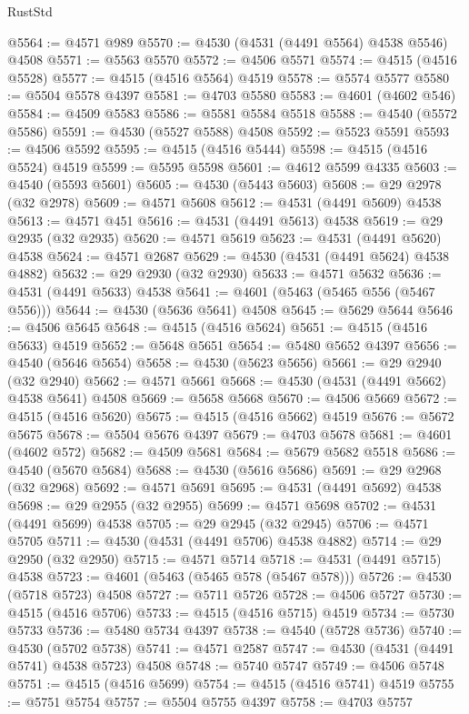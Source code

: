 \begin{lexlean}{RustStd}
\begin{coremodule}
@5564 := @4571 @989
@5570 := @4530 (@4531 (@4491 @5564) @4538 @5546) @4508
@5571 := @5563 @5570
@5572 := @4506 @5571
@5574 := @4515 (@4516 @5528)
@5577 := @4515 (@4516 @5564) @4519
@5578 := @5574 @5577
@5580 := @5504 @5578 @4397
@5581 := @4703 @5580
@5583 := @4601 (@4602 @546)
@5584 := @4509 @5583
@5586 := @5581 @5584 @5518
@5588 := @4540 (@5572 @5586)
@5591 := @4530 (@5527 @5588) @4508
@5592 := @5523 @5591
@5593 := @4506 @5592
@5595 := @4515 (@4516 @5444)
@5598 := @4515 (@4516 @5524) @4519
@5599 := @5595 @5598
@5601 := @4612 @5599 @4335
@5603 := @4540 (@5593 @5601)
@5605 := @4530 (@5443 @5603)
@5608 := @29 @2978 (@32 @2978)
@5609 := @4571 @5608
@5612 := @4531 (@4491 @5609) @4538
@5613 := @4571 @451
@5616 := @4531 (@4491 @5613) @4538
@5619 := @29 @2935 (@32 @2935)
@5620 := @4571 @5619
@5623 := @4531 (@4491 @5620) @4538
@5624 := @4571 @2687
@5629 := @4530 (@4531 (@4491 @5624) @4538 @4882)
@5632 := @29 @2930 (@32 @2930)
@5633 := @4571 @5632
@5636 := @4531 (@4491 @5633) @4538
@5641 := @4601 (@5463 (@5465 @556 (@5467 @556)))
@5644 := @4530 (@5636 @5641) @4508
@5645 := @5629 @5644
@5646 := @4506 @5645
@5648 := @4515 (@4516 @5624)
@5651 := @4515 (@4516 @5633) @4519
@5652 := @5648 @5651
@5654 := @5480 @5652 @4397
@5656 := @4540 (@5646 @5654)
@5658 := @4530 (@5623 @5656)
@5661 := @29 @2940 (@32 @2940)
@5662 := @4571 @5661
@5668 := @4530 (@4531 (@4491 @5662) @4538 @5641) @4508
@5669 := @5658 @5668
@5670 := @4506 @5669
@5672 := @4515 (@4516 @5620)
@5675 := @4515 (@4516 @5662) @4519
@5676 := @5672 @5675
@5678 := @5504 @5676 @4397
@5679 := @4703 @5678
@5681 := @4601 (@4602 @572)
@5682 := @4509 @5681
@5684 := @5679 @5682 @5518
@5686 := @4540 (@5670 @5684)
@5688 := @4530 (@5616 @5686)
@5691 := @29 @2968 (@32 @2968)
@5692 := @4571 @5691
@5695 := @4531 (@4491 @5692) @4538
@5698 := @29 @2955 (@32 @2955)
@5699 := @4571 @5698
@5702 := @4531 (@4491 @5699) @4538
@5705 := @29 @2945 (@32 @2945)
@5706 := @4571 @5705
@5711 := @4530 (@4531 (@4491 @5706) @4538 @4882)
@5714 := @29 @2950 (@32 @2950)
@5715 := @4571 @5714
@5718 := @4531 (@4491 @5715) @4538
@5723 := @4601 (@5463 (@5465 @578 (@5467 @578)))
@5726 := @4530 (@5718 @5723) @4508
@5727 := @5711 @5726
@5728 := @4506 @5727
@5730 := @4515 (@4516 @5706)
@5733 := @4515 (@4516 @5715) @4519
@5734 := @5730 @5733
@5736 := @5480 @5734 @4397
@5738 := @4540 (@5728 @5736)
@5740 := @4530 (@5702 @5738)
@5741 := @4571 @2587
@5747 := @4530 (@4531 (@4491 @5741) @4538 @5723) @4508
@5748 := @5740 @5747
@5749 := @4506 @5748
@5751 := @4515 (@4516 @5699)
@5754 := @4515 (@4516 @5741) @4519
@5755 := @5751 @5754
@5757 := @5504 @5755 @4397
@5758 := @4703 @5757

\end{coremodule}
\end{lexlean}
